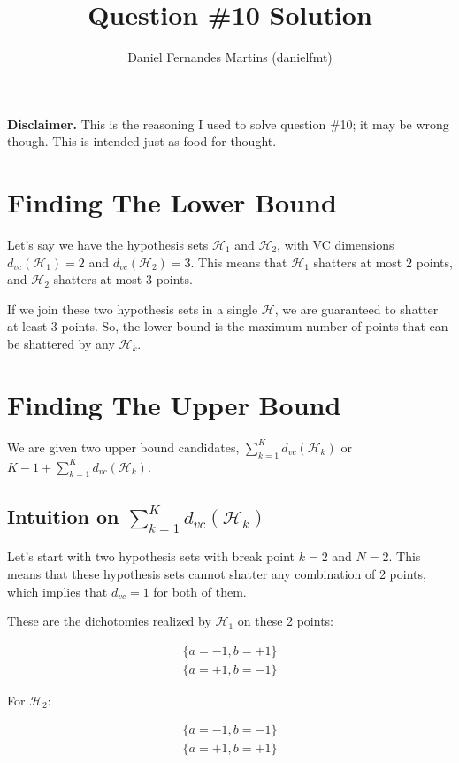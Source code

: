 \documentclass{article}
\author{Daniel Fernandes Martins (danielfmt)}
\title{Question \#10 Solution}
\begin{document}
\maketitle

\textbf{Disclaimer.} This is the reasoning I used to solve question \#10; it
may be wrong though. This is intended just as food for thought.

\section{Finding The Lower Bound}

Let's say we have the hypothesis sets $\mathcal{H}_1$ and $\mathcal{H}_2$,
with VC dimensions $d_{vc}(\mathcal{H}_1)=2$ and $d_{vc}(\mathcal{H}_2)=3$.
This means that $\mathcal{H}_1$ shatters at most $2$ points, and
$\mathcal{H}_2$ shatters at most $3$ points.

If we join these two hypothesis sets in a single $\mathcal{H}$, we are
guaranteed to shatter at least $3$ points. So, the lower bound is the
maximum number of points that can be shattered by any $\mathcal{H}_k$.

\section{Finding The Upper Bound}

We are given two upper bound candidates, $\sum_{k=1}^Kd_{vc}(\mathcal{H}_k)$
or $K-1+\sum_{k=1}^Kd_{vc}(\mathcal{H}_k)$.

\subsection {Intuition on $\sum_{k=1}^Kd_{vc}(\mathcal{H}_k)$}

Let's start with two hypothesis sets with break point $k=2$ and $N=2$. This
means that these hypothesis sets cannot shatter any combination of 2 points,
which implies that $d_{vc}=1$ for both of them.

These are the dichotomies realized by $\mathcal{H}_1$ on these 2 points:

\begin{equation*}
\begin{split}
\{a=-1, b=+1\} \\
\{a=+1, b=-1\}
\end{split}
\end{equation*}

For $\mathcal{H}_2$:

\begin{equation*}
\begin{split}
\{a=-1, b=-1\} \\
\{a=+1, b=+1\}
\end{split}
\end{equation*}
\end{document}
